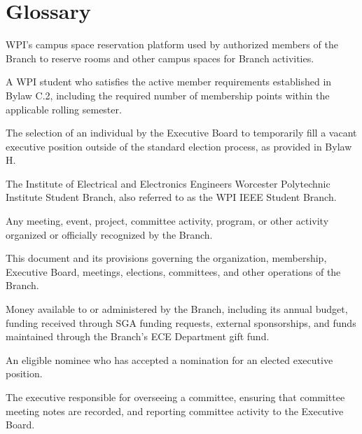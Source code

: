 \documentclass[11pt,a4paper]{article}
\begin{document}
\section*{Glossary}
\begin{description}[style=nextline, leftmargin=1.5em]
    \item[25Live]
    WPI's campus space reservation platform used by authorized members of the Branch to reserve rooms and other campus spaces for Branch activities.

    \item[Active Member]
    A WPI student who satisfies the active member requirements established in Bylaw C.2, including the required number of membership points within the applicable rolling semester.

    \item[Appointment]
    The selection of an individual by the Executive Board to temporarily fill a vacant executive position outside of the standard election process, as provided in Bylaw H.

    \item[Branch]
    The Institute of Electrical and Electronics Engineers Worcester Polytechnic Institute Student Branch, also referred to as the WPI IEEE Student Branch.
    
    \item[Branch Activity]
    Any meeting, event, project, committee activity, program, or other activity organized or officially recognized by the Branch.

    \item[Branch Bylaws]
    This document and its provisions governing the organization, membership, Executive Board, meetings, elections, committees, and other operations of the Branch.

    \item[Branch Funds]
    Money available to or administered by the Branch, including its annual budget, funding received through SGA funding requests, external sponsorships, and funds maintained through the Branch's ECE Department gift fund.
    
    \item[Candidate]
    An eligible nominee who has accepted a nomination for an elected executive position.

    \item[Committee Lead]
    The executive responsible for overseeing a committee, ensuring that committee meeting notes are recorded, and reporting committee activity to the Executive Board.


\end{description}
\end{document}

